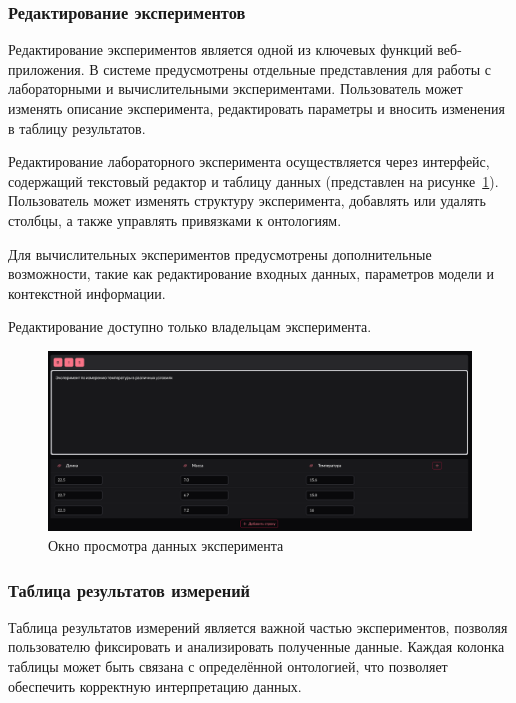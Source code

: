\subsubsection{Редактирование экспериментов}

Редактирование экспериментов является одной из ключевых функций веб-приложения. В системе предусмотрены отдельные представления для работы с лабораторными и вычислительными экспериментами. Пользователь может изменять описание эксперимента, редактировать параметры и вносить изменения в таблицу результатов.

Редактирование лабораторного эксперимента осуществляется через интерфейс, содержащий текстовый редактор и таблицу данных (представлен на рисунке~\ref{pic:lab_experiment_editor}). Пользователь может изменять структуру эксперимента, добавлять или удалять столбцы, а также управлять привязками к онтологиям.

Для вычислительных экспериментов предусмотрены дополнительные возможности, такие как редактирование входных данных, параметров модели и контекстной информации.

Редактирование доступно только владельцам эксперимента.

\begin{figure}[H]
    \centering
    \includegraphics[width=\linewidth]{img/experiment_view.png}
    \caption{Окно просмотра данных эксперимента}
    \label{pic:lab_experiment_editor}
\end{figure}
\vspace{0.5cm}

\subsubsection{Таблица результатов измерений}

Таблица результатов измерений является важной частью экспериментов, позволяя пользователю фиксировать и анализировать полученные данные. Каждая колонка таблицы может быть связана с определённой онтологией, что позволяет обеспечить корректную интерпретацию данных.

